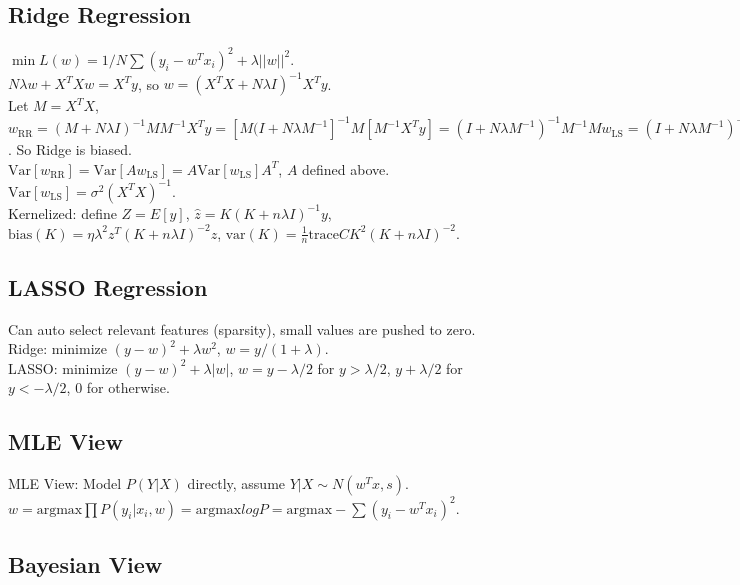 \subsection*{Ridge Regression}

$\min L(w) = 1/N \sum(y_i - w^T x_i)^2 + \lambda ||w||^2$.\\
$N \lambda w + X^T X w = X^T y$, so $w = (X^T X + N \lambda I)^{-1} X^T y$.\\
Let $M = X^T X$, $w_{\text{RR}} = (M+N\lambda I)^{-1}MM^{-1}X^Ty = [M(I+N\lambda M^{-1}]^{-1}M[M^{-1}X^T y] = (I+N\lambda M^{-1})^{-1} M^{-1}Mw_{\text{LS}} = (I + N \lambda M^{-1})^{-1} w_{\text{LS}}$. So Ridge is biased.\\
$\text{Var}[w_{\text{RR}}] = \text{Var}[A w_{\text{LS}}] = A \text{Var}[w_{\text{LS}}] A^T$, $A$ defined above.\\
$\text{Var}[w_{\text{LS}}] = \sigma^2 (X^T X)^{-1}$.\\
Kernelized: define $Z = E[y]$, $\hat{z} = K(K+n\lambda I)^{-1}y$, $\text{bias}(K) = \eta \lambda^2 z^T (K + n\lambda I)^{-2} z$, $\text{var}(K) = \frac{1}{n}\text{trace} C K^2 (K+n\lambda I)^{-2}$.

\subsection*{LASSO Regression}

Can auto select relevant features (sparsity), small values are pushed to zero.\\
Ridge: minimize $(y-w)^2 + \lambda w^2$, $w = y/(1+\lambda)$.\\
LASSO: minimize $(y-w)^2 + \lambda |w|$, $w = y-\lambda/2$ for $y > \lambda/2$, $y + \lambda / 2$ for $y < -\lambda/2$, $0$ for otherwise.

\subsection*{MLE View}

MLE View: Model $P(Y|X)$ directly, assume $Y | X \sim N(w^T x, s)$.\\
$w = \text{argmax} \prod P(y_i|x_i, w) = \text{argmax} log P = \text{argmax} - \sum (y_i - w^T x_i)^2$.

\subsection*{Bayesian View}

